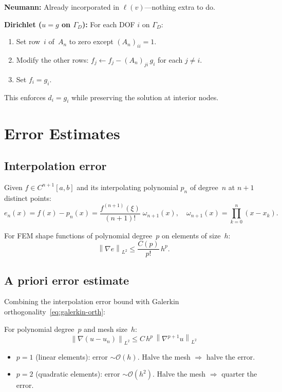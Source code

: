 \documentclass[11pt,a4paper]{article}
\theoremstyle{plain}
\theoremstyle{remark}
\newcommand{\norm}[1]{\left\| #1 \right\|}
\newcommand{\un}{u_n}
\let\origsubsection\subsection
\renewcommand{\subsection}{\needspace{6\baselineskip}\origsubsection}
\begin{document}
\textbf{Neumann:} Already incorporated in $\ell(v)$---nothing extra
to do.

\medskip
\textbf{Dirichlet ($u = g$ on $\Gamma_D$):}
For each DOF $i$ on $\Gamma_D$:
\begin{enumerate}[nosep]
  \item Set row~$i$ of~$A_n$ to zero except $(A_n)_{ii} = 1$.
  \item Modify the other rows:
        $f_j \leftarrow f_j - (A_n)_{ji}\,g_i$ for each $j \neq i$.
  \item Set $f_i = g_i$.
\end{enumerate}
This enforces $d_i = g_i$ while preserving the solution at
interior nodes.

\newpage
\section{Error Estimates}
\label{sec:error}

\subsection{Interpolation error}

\begin{definition}
Given $f \in C^{n+1}[a,b]$ and its interpolating polynomial $p_n$ of
degree~$n$ at $n+1$ distinct points:
\[
  e_n(x)
  = f(x) - p_n(x)
  = \frac{f^{(n+1)}(\xi)}{(n+1)!}\;\omega_{n+1}(x),
  \quad
  \omega_{n+1}(x)
  = \prod_{k=0}^{n}(x - x_k).
\]
\end{definition}

For FEM shape functions of polynomial degree~$p$ on elements of
size~$h$:
\[
  \norm{\nabla e}_{L^2} \leq \frac{C(p)}{p!}\, h^p.
\]

\subsection{A priori error estimate}

Combining the interpolation error bound with Galerkin
orthogonality~\eqref{eq:galerkin-orth}:

\begin{keyidea}
For polynomial degree~$p$ and mesh size~$h$:
\begin{equation}
  \boxed{\;\norm{\nabla(u - \un)}_{L^2}
         \leq C\, h^p\, \norm{\nabla^{p+1} u}_{L^2}\;}
  \label{eq:apriori}
\end{equation}
\begin{itemize}[nosep]
  \item $p=1$ (linear elements): error $\sim \mathcal{O}(h)$.
        Halve the mesh $\Rightarrow$ halve the error.
  \item $p=2$ (quadratic elements): error $\sim \mathcal{O}(h^2)$.
        Halve the mesh $\Rightarrow$ quarter the error.
\end{itemize}
\end{keyidea}
\end{document}
